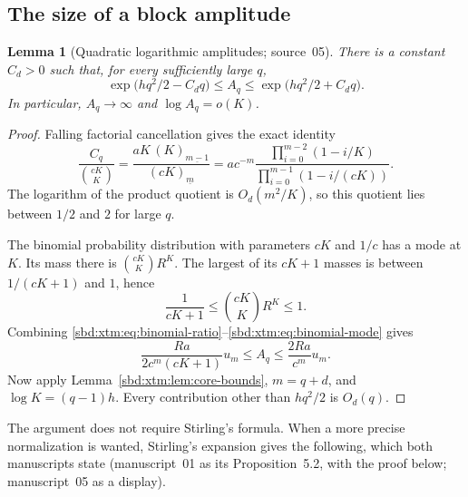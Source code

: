 \documentclass[11pt,a4paper]{article}
\newtheorem{lemma}[theorem]{Lemma}
\theoremstyle{definition}
\newcommand{\fall}[2]{(#1)_{\underline{#2}}}
\begin{document}
\subsection{The size of a block amplitude}
\begin{lemma}[Quadratic logarithmic amplitudes; source~05]\label{sbd:xtm:lem:amplitudes}
There is a constant $C_d>0$ such that, for every sufficiently large $q$,
\begin{equation}\label{sbd:xtm:eq:amplitude-envelope}
 \exp\bigl(hq^2/2-C_dq\bigr)
 \le A_q\le
 \exp\bigl(hq^2/2+C_dq\bigr).
\end{equation}
In particular, $A_q\to\infty$ and $\log A_q=o(K)$.
\end{lemma}
\begin{proof}
Falling factorial cancellation gives the exact identity
\begin{equation}\label{sbd:xtm:eq:binomial-ratio}
 \frac{C_q}{\binom{cK}{K}}
 =\frac{aK\,\fall K{m-1}}{\fall{cK}m}
 =ac^{-m}
 \frac{\prod_{i=0}^{m-2}(1-i/K)}
      {\prod_{i=0}^{m-1}(1-i/(cK))}.
\end{equation}
The logarithm of the product quotient is $O_d(m^2/K)$, so this
quotient lies between $1/2$ and $2$ for large $q$.

The binomial probability distribution with parameters $cK$ and $1/c$
has a mode at $K$. Its mass there is
$\binom{cK}{K}R^K$. The largest of its $cK+1$ masses is between
$1/(cK+1)$ and $1$, hence
\begin{equation}\label{sbd:xtm:eq:binomial-mode}
 \frac1{cK+1}\le\binom{cK}{K}R^K\le1.
\end{equation}
Combining \eqref{sbd:xtm:eq:binomial-ratio}--\eqref{sbd:xtm:eq:binomial-mode} gives
\begin{equation}\label{sbd:xtm:eq:amplitude-elementary}
 \frac{Ra}{2c^m(cK+1)}u_m
 \le A_q\le\frac{2Ra}{c^m}u_m.
\end{equation}
Now apply Lemma~\ref{sbd:xtm:lem:core-bounds}, $m=q+d$, and $\log K=(q-1)h$.
Every contribution other than $hq^2/2$ is $O_d(q)$.
\end{proof}

The argument does not require Stirling's formula. When a more precise
normalization is wanted, Stirling's expansion gives the following, which
both manuscripts state (manuscript~01 as its Proposition~5.2, with the proof
below; manuscript~05 as a display).
\end{document}
